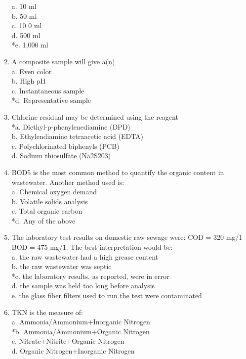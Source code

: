 \begin{enumerate}
a. 10 ml \\
b. 50 ml \\
c. 10 0 ml \\
d. 500 ml \\
*e. 1,000 ml 

\item A composite sample will give a(n) \\

a. Even color \\
b. High pH \\
c. Instantaneous sample \\
*d. Representative sample 

\item Chlorine residual may be determined using the reagent \\

*a. Diethyl-p-phenylenediamine (DPD) \\
b. Ethylendiamine tetraacetic acid (EDTA) \\
c. Polychlorinated biphenyls (PCB) \\
d. Sodium thiosulfate (Na2S203) 

\item BOD5 is the most common method to quantify the organic content in wastewater. Another method used is: \\

a. Chemical oxygen demand \\
b. Volatile solids analysis \\
c. Total organic carbon \\
*d. Any of the above 

\item The laboratory test results on domestic raw sewage were: COD = 320 mg/1 BOD = 475 mg/1. The best interpretation would be: \\

a. the raw wastewater had a high grease content \\
b. the raw wastewater was septic \\
*c. the laboratory results, as reported, were in error \\
d. the sample was held too long before analysis \\
e. the glass fiber filters used to run the test were contaminated 

\item TKN is the measure of: \\

a. Ammonia/Ammonium+Inorganic Nitrogen \\
*b. Ammonia/Ammonium+Organic Nitrogen \\
c. Nitrate+Nitrite+Organic Nitrogen \\
d. Organic Nitrogen+Inorganic Nitrogen 


\end{enumerate}
